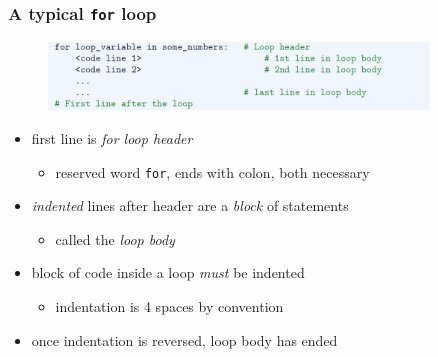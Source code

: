 \documentclass[english,14pt]{beamer}
\newcommand\red[1]{{\color{red} #1}}
\begin{document}
\begin{frame}[fragile]

\frametitle{A typical \texttt{for} loop}

\begin{figure}[ht]
	\centering
	\includegraphics[width=0.9\textwidth]{figures/LLp60c}
\end{figure}
	\vspace*{-3mm}
\begin{itemize}
	\item first line is \red{\emph{for loop header}}
	\begin{itemize}
		\item reserved word \texttt{for}, ends with colon, both necessary
	\end{itemize}
	\item \red{\emph{indented}} lines after header are a \red{\emph{block}} of statements%
	\begin{itemize}
		\item called the \red{\emph{loop body}}
	\end{itemize}
	\item block of code inside a loop \emph{must} be indented 
	\begin{itemize}
		\item indentation is 4 spaces by convention %
	\end{itemize}
	\item once indentation is reversed, loop body has ended
\end{itemize}

\end{frame}

\end{document}
